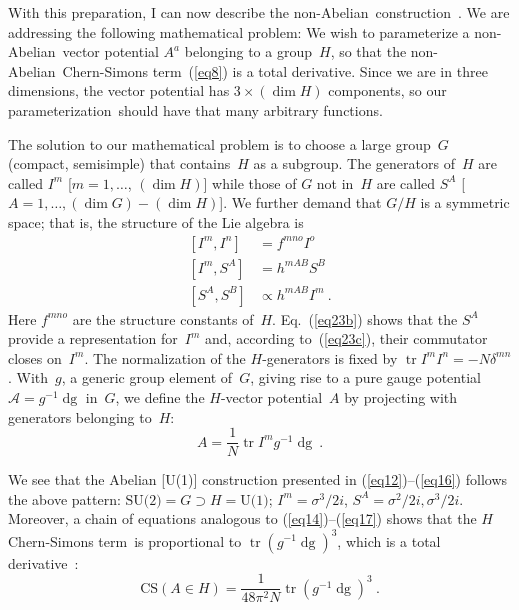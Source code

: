 \documentclass[a4paper,12pt,twoside]{article}
\newcommand{\rd}[1]{\mathop{\mathrm{d}#1}}
\newcommand{\tr}{\mathop{\mathrm{tr}}}
\newcommand{\nA}{non-Abelian}
\newcommand{\CSt}{Chern-Simons term}
\newcommand{\pr}{para\-me\-ter\-iza\-tion}
\newcommand{\gdg}{g^{-1} \rd g}
\newcommand{\numeq}[2]{\begin{equation}
#2
\label{#1}
\end{equation}}
\newcommand{\refeq}[1]{(\ref{#1})}
\begin{document}
With this preparation, I can now describe the \nA\ construction~\cite{ref14}. We are
addressing the following mathematical problem: We wish to parameterize a \nA\
vector potential $A^a$ belonging to a group~$H$, so that the \nA\ \CSt~\refeq{eq8} is
a total derivative. Since we are in three dimensions, the vector potential has
$3\times (\dim H)$ components, so our \pr\ should have that many
arbitrary functions.

The solution to our mathematical problem is to choose a large group~$G$
(compact,  semi\-simple) that contains~$H$ as a subgroup. The generators
of~$H$ are called $I^m$ [$m=1,\ldots$, $(\dim H)$] while those of $G$ not
in~$H$ are called $S^A$  [$A=1,\ldots, (\dim G) - (\dim H)$].
We further demand that
$G/H$ is a symmetric space; that is, the structure of the Lie algebra is 
\begin{subequations}\label{eq23}
\begin{align}
[I^m, I^n] &= f^{mno} I^o \label{eq23a}\\
[I^m, S^A] &= h^{mAB} S^B \label{eq23b}\\
[S^A, S^B] &\propto h^{mAB} I^m\ . \label{eq23c}
\end{align}
\end{subequations}
Here $f^{mno}$ are the structure constants of~$H$. Eq.~\refeq{eq23b} shows that the
$S^A$ provide a representation for~$I^m$ and, according to~\refeq{eq23c}, their
commutator closes on~$I^m$. The normalization of the $H$-generators is fixed by $\tr
I^m I^n = -N\delta^{mn}$. With~$g$, a generic group element of~$G$, giving rise to a
pure gauge potential $\mathcal A = \gdg$ in~$G$, we define the $H$-vector
potential~$A$ by projecting with generators belonging to~$H$:
\numeq{eq24}{
A = \frac1N \tr I^m \gdg\ .
}

We see that the Abelian [U(1)] construction presented in \refeq{eq12}--\refeq{eq16}
follows the above pattern: $\text{SU(2)}= G\supset H= \text{U(1)}$; $I^m=
\sigma^3/2i$, $S^A=\sigma^2/2i,\sigma^3/2i $. Moreover, a chain of equations
analogous to \refeq{eq14}--\refeq{eq17} shows that the $H$ \CSt\ is proportional to
$\tr(\gdg)^3$, which is  a total derivative~\cite{ref9,ref13}:
\numeq{eq30}{
\text{CS}(A\in  H) = \frac1{48\pi^2N} \tr(\gdg)^3\ .
} 
\end{document}
